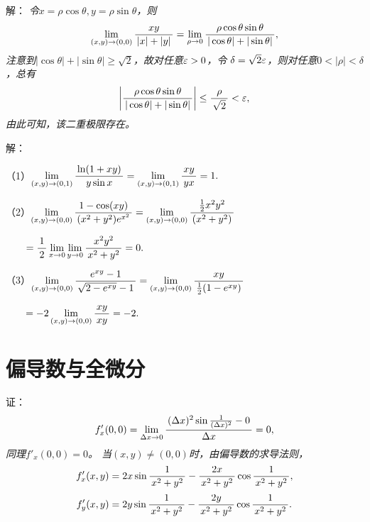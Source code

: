 \begin{frame}
	\linespread{1.5}
	
	\bigskip
	
	\small 解：\it
	令$x=\rho\cos\theta,y=\rho\sin\theta$，则
	$$\lim\limits_{(x,y)\to(0,0)}\displaystyle\frac{\,{xy}\,}{\,{|x|+|y|}\,}
	=\lim\limits_{\rho\to0}\displaystyle\frac{\,{\rho\cos\theta\sin\theta}\,}{\,{|\cos\theta|+|\sin\theta|}\,},$$
	注意到$|\cos\theta|+|\sin\theta|\geq\sqrt2$，故对任意$\varepsilon>0$，令
	$\delta=\sqrt2\varepsilon$，则对任意$0<|\rho|<\delta$，总有
	$$\left|\displaystyle\frac{\,{\rho\cos\theta\sin\theta}\,}{\,{|\cos\theta|+|\sin\theta|}\,}\right|
	\leq\displaystyle\frac{\,{\rho}\,}{\,{\sqrt2}\,}<\varepsilon,$$
	由此可知，该二重极限存在。\fin
	
\end{frame}

\begin{frame}
	\linespread{1.5}

	\bigskip
	
	\small 解：
	
	（1）$\lim\limits_{(x,y)\to(0,1)}\displaystyle\frac{\,{\ln(1+xy)}\,}{\,{y\sin x}\,}
	=\lim\limits_{(x,y)\to(0,1)}\displaystyle\frac{\,{xy}\,}{\,{yx}\,}=1.$
	
	（2）$\lim\limits_{(x,y)\to(0,0)}\displaystyle\frac{\,{1-\cos(xy)}\,}{\,{(x^2+y^2)e^{x^2}}\,}
	=\lim\limits_{(x,y)\to(0,0)}\displaystyle\frac{\,{\frac12x^2y^2}\,}{\,{(x^2+y^2)}\,}$
	
	$\quad\quad=\displaystyle\frac{\,{1}\,}{\,{2}\,}\lim\limits_{x\to
	0}\lim\limits_{y\to0}\displaystyle\frac{\,{x^2y^2}\,}{\,{x^2+y^2}\,}=0.$
	
	（3）$\lim\limits_{(x,y)\to(0,0)}\displaystyle\frac{\,{e^{xy}-1}\,}{\,{\sqrt{2-e^{xy}}-1}\,}
	=\lim\limits_{(x,y)\to(0,0)}\displaystyle\frac{\,{xy}\,}{\,{\frac12(1-e^{xy})}\,}$
	
	$\quad\quad=-2\lim\limits_{(x,y)\to(0,0)}\displaystyle\frac{\,{xy}\,}{\,{xy}\,}=-2.$
	\fin
	
\end{frame}

\section{偏导数与全微分}

\begin{frame}
	\linespread{1.5}
	\pause

	\small 证：\it
	$$f'_x(0,0)=\lim\limits_{\Delta x\to 0}
	\displaystyle\frac{\,{(\Delta x)^2\sin\frac1{(\Delta x)^2}-0}\,}{\,{\Delta x}\,}=0,$$
	同理$f'_x(0,0)=0$。
	当$(x,y)\ne(0,0)$时，由偏导数的求导法则，
	$$f'_x(x,y)=2x\sin\displaystyle\frac{\,{1}\,}{\,{x^2+y^2}\,}-\displaystyle\frac{\,{2x}\,}{\,{x^2+y^2}\,}\cos\displaystyle\frac{\,{1}\,}{\,{x^2+y^2}\,},$$
	$$f'_y(x,y)=2y\sin\displaystyle\frac{\,{1}\,}{\,{x^2+y^2}\,}-\displaystyle\frac{\,{2y}\,}{\,{x^2+y^2}\,}\cos\displaystyle\frac{\,{1}\,}{\,{x^2+y^2}\,}.$$
\end{frame}

